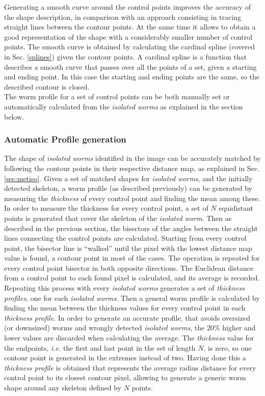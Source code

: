 Generating a smooth curve around the control points improves the accuracy of the shape
description, in comparison with an approach consisting in tracing straight lines
between the contour points. At the same time it allows to obtain a good representation
of the shape with a considerably smaller number of control points. The smooth curve
is obtained by calculating the cardinal spline (covered in Sec. \ref{splines}) given the
contour points. A cardinal spline is a function that describes a smooth curve that
passes over all the points of a set, given a starting and ending point. In this case
the starting and ending points are the same, so the described contour is closed.\\

The worm profile for a set of control points can be both manually set or automatically
calculated from the \emph{isolated worms} as explained in the section below.

\subsubsection{Automatic Profile generation}
\label{sec:metwormprof}

The shape of \emph{isolated worms} identified in the image can be accurately matched
by following the contour points in their respective distance map, as explained 
in Sec. \ref{sec:metiso}. Given a set of matched shapes for \emph{isolated worms}, and
the initially detected skeleton, a worm profile (as described previously) can be 
generated by measuring the \emph{thickness} of every control point and finding the mean
among these.\\

In order to measure the thickness for every control point, a set of
$N$ equidistant points is generated that cover the skeleton of the \emph{isolated worm}.
Then as described in the previous section, the bisectors of the angles between the 
straight lines connecting the control points are calculated. Starting from every control
point, the bisector line is ``walked'' until the pixel with the lowest distance map
value is found, a contour point in most of the cases. The operation is repeated for every 
control point bisector in both opposite directions. The Euclidean distance from a control
point to each found pixel is calculated, and its average is recorded. Repeating this process
with every  \emph{isolated worms} generates a set of \emph{thickness profiles}, one for each
\emph{isolated worms}. Then a general worm profile is calculated by finding the mean between
the thickness values for every control point in each \emph{thickness profile}. In order 
to generate an accurate profile, that avoids oversized (or downsized) worms and wrongly
detected \emph{isolated worms}, the $20\%$ higher and lower values are discarded when 
calculating the average. The \emph{thickness} value for
the endpoints, \emph{i.e.} the first and last point in the set of length $N$, is zero,
so one contour point is generated in the extremes instead of two.
Having done this a \emph{thickness profile} is obtained that represents the average 
radius distance for every control point to its closest contour pixel, allowing 
to generate a generic worm shape around any skeleton defined by $N$ points. 


